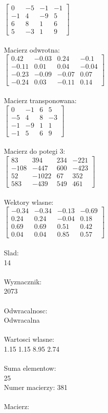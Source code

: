 \documentclass[a4paper,12pt]{article}
\begin{document}
$\begin{bmatrix} 0&-5&-1&-1\\-1&4&-9&5\\6&8&1&6\\5&-3&1&9 \end{bmatrix}$
\\
\\
Macierz odwrotna:\\

$\begin{bmatrix} 0.42&-0.03&0.24&-0.1\\-0.11&0.01&0.04&-0.04\\-0.23&-0.09&-0.07&0.07\\-0.24&0.03&-0.11&0.14 \end{bmatrix}$
\\
\\
Macierz transponowana:\\

$\begin{bmatrix} 0&-1&6&5\\-5&4&8&-3\\-1&-9&1&1\\-1&5&6&9 \end{bmatrix}$
\\
\\
Macierz do potegi 3:\\

$\begin{bmatrix} 83&394&234&-221\\-108&-447&600&-423\\52&-1022&67&352\\583&-439&549&461 \end{bmatrix}$
\\
\\
Wektory wlasne:\\

$\begin{bmatrix} -0.34&-0.34&-0.13&-0.69\\0.24&0.24&-0.04&0.18\\0.69&0.69&0.51&0.42\\0.04&0.04&0.85&0.57 \end{bmatrix}$
\\
\\
Slad:\\
14
\\
\\
Wyznacznik:\\
2073
\\
\\
Odwracalnosc:\\
Odwracalna
\\
\\
Wartosci wlasne:\\
1.15 1.15 8.95 2.74
\\
\\
Suma elementow:\\
25
\\
\newpage
Numer macierzy:
381
\\
\\
Macierz:\\
\end{document}
